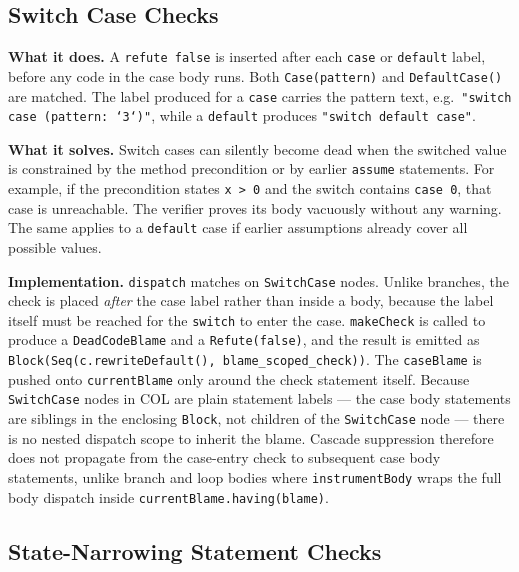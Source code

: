 \documentclass[9pt,a4paper,twocolumn]{article}
\begin{document}
\subsection{Switch Case Checks}

\textbf{What it does.} A \texttt{refute false} is inserted after
each \texttt{case} or \texttt{default} label, before any code in
the case body runs. Both \texttt{Case(pattern)} and
\texttt{DefaultCase()} are matched. The label produced for a
\texttt{case} carries the pattern text, e.g.\
\texttt{"switch case (pattern: `3`)"}, while a \texttt{default}
produces \texttt{"switch default case"}.

\textbf{What it solves.} Switch cases can silently become dead when
the switched value is constrained by the method precondition or by
earlier \texttt{assume} statements. For example, if the precondition
states \texttt{x > 0} and the switch contains \texttt{case 0}, that
case is unreachable. The verifier proves its body vacuously without
any warning. The same applies to a \texttt{default} case if earlier
assumptions already cover all possible values.

\textbf{Implementation.} \texttt{dispatch} matches on
\texttt{SwitchCase} nodes. Unlike branches, the check is placed
\emph{after} the case label rather than inside a body, because the
label itself must be reached for the \texttt{switch} to enter the
case. \texttt{makeCheck} is called to produce a
\texttt{DeadCodeBlame} and a \texttt{Refute(false)}, and the result
is emitted as \texttt{Block(Seq(c.rewriteDefault(), blame\_scoped\_check))}.
The \texttt{caseBlame} is pushed onto \texttt{currentBlame} only
around the check statement itself. Because \texttt{SwitchCase}
nodes in COL are plain statement labels — the case body statements
are siblings in the enclosing \texttt{Block}, not children of the
\texttt{SwitchCase} node — there is no nested dispatch scope to
inherit the blame. Cascade suppression therefore does not propagate
from the case-entry check to subsequent case body statements, unlike
branch and loop bodies where \texttt{instrumentBody} wraps the full
body dispatch inside \texttt{currentBlame.having(blame)}.

\subsection{State-Narrowing Statement Checks}
\end{document}
